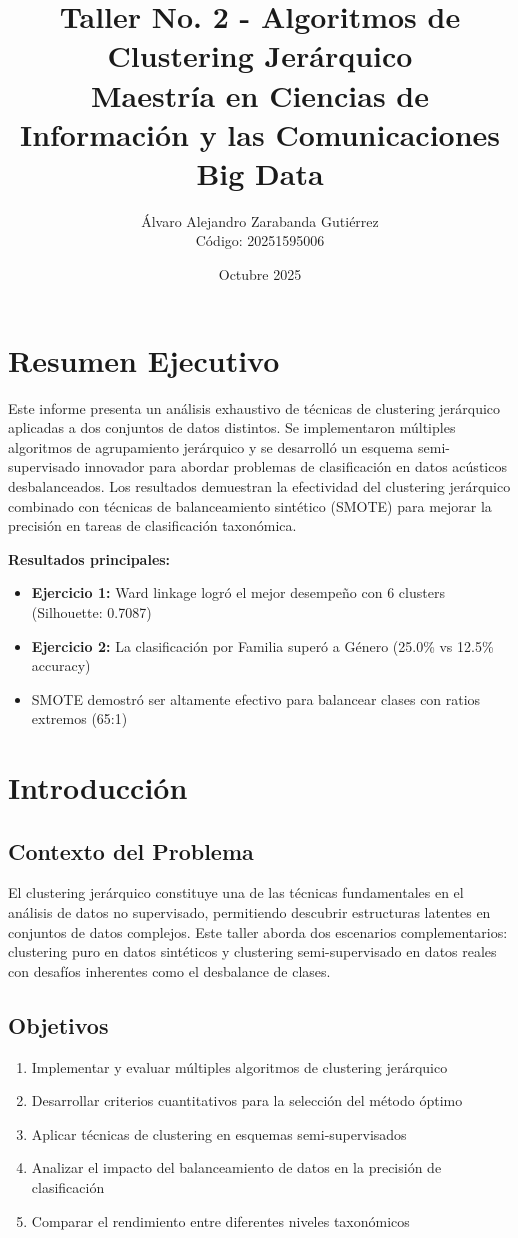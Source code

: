 \documentclass[12pt,a4paper]{article}
\title{Taller No. 2 - Algoritmos de Clustering Jerárquico\\
\large Maestría en Ciencias de Información y las Comunicaciones\\
\large Big Data}
\author{Álvaro Alejandro Zarabanda Gutiérrez\\Código: 20251595006}
\date{Octubre 2025}
\begin{document}
\maketitle

\tableofcontents
\newpage

\section{Resumen Ejecutivo}
Este informe presenta un análisis exhaustivo de técnicas de clustering jerárquico aplicadas a dos conjuntos de datos distintos. Se implementaron múltiples algoritmos de agrupamiento jerárquico y se desarrolló un esquema semi-supervisado innovador para abordar problemas de clasificación en datos acústicos desbalanceados. Los resultados demuestran la efectividad del clustering jerárquico combinado con técnicas de balanceamiento sintético (SMOTE) para mejorar la precisión en tareas de clasificación taxonómica.

\textbf{Resultados principales:}
\begin{itemize}
    \item \textbf{Ejercicio 1:} Ward linkage logró el mejor desempeño con 6 clusters (Silhouette: 0.7087)
    \item \textbf{Ejercicio 2:} La clasificación por Familia superó a Género (25.0\% vs 12.5\% accuracy)
    \item SMOTE demostró ser altamente efectivo para balancear clases con ratios extremos (65:1)
\end{itemize}

\section{Introducción}
\subsection{Contexto del Problema}
El clustering jerárquico constituye una de las técnicas fundamentales en el análisis de datos no supervisado, permitiendo descubrir estructuras latentes en conjuntos de datos complejos. Este taller aborda dos escenarios complementarios: clustering puro en datos sintéticos y clustering semi-supervisado en datos reales con desafíos inherentes como el desbalance de clases.

\subsection{Objetivos}
\begin{enumerate}
    \item Implementar y evaluar múltiples algoritmos de clustering jerárquico
    \item Desarrollar criterios cuantitativos para la selección del método óptimo
    \item Aplicar técnicas de clustering en esquemas semi-supervisados
    \item Analizar el impacto del balanceamiento de datos en la precisión de clasificación
    \item Comparar el rendimiento entre diferentes niveles taxonómicos
\end{enumerate}
\end{document}
